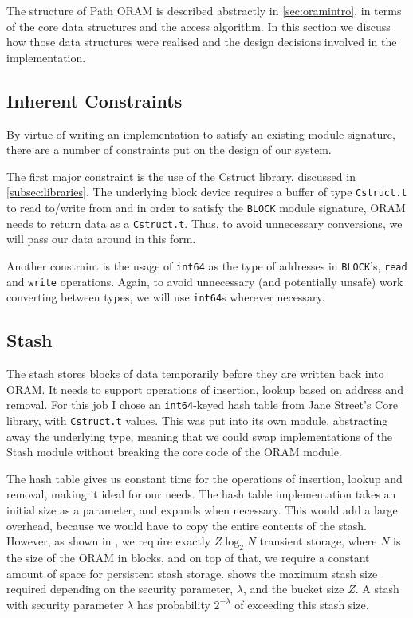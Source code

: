 \documentclass[12pt,a4paper,twoside,openright]{report}
\begin{document}
The structure of Path ORAM is described abstractly in \cref{sec:oramintro}, in terms of the core data structures and the access algorithm. In this section we discuss how those data structures were realised and the design decisions involved in the implementation.

\subsection{Inherent Constraints}
\label{subsec:constraints}

By virtue of writing an implementation to satisfy an existing module signature, there are a number of constraints put on the design of our system.

The first major constraint is the use of the Cstruct library, discussed in \cref{subsec:libraries}. The underlying block device requires a buffer of type \texttt{Cstruct.t} to read to/write from and in order to satisfy the \texttt{BLOCK} module signature, ORAM needs to return data as a \texttt{Cstruct.t}. Thus, to avoid unnecessary conversions, we will pass our data around in this form.

Another constraint is the usage of \texttt{int64} as the type of addresses in \texttt{BLOCK}'s, \texttt{read} and \texttt{write} operations. Again, to avoid unnecessary (and potentially unsafe) work converting between types, we will use \texttt{int64}s wherever necessary.

\subsection{Stash}

The stash stores blocks of data temporarily before they are written back into ORAM. It needs to support operations of insertion, lookup based on address and removal. For this job I chose an \texttt{int64}-keyed hash table from Jane Street's Core library, with \texttt{Cstruct.t} values. This was put into its own module, abstracting away the underlying type, meaning that we could swap implementations of the Stash module without breaking the core code of the ORAM module.

The hash table gives us constant time for the operations of insertion, lookup and removal, making it ideal for our needs. The hash table implementation takes an initial size as a parameter, and expands when necessary. This would add a large overhead, because we would have to copy the entire contents of the stash. However, as shown in \cite{stefanov2013path}, we require exactly $Z\log_2N$ transient storage, where $N$ is the size of the ORAM in blocks, and on top of that, we require a constant amount of space for persistent stash storage.  shows the maximum stash size required depending on the security parameter, $\lambda$, and the bucket size $Z$. A stash with security parameter $\lambda$ has probability $2^{-\lambda}$ of exceeding this stash size.
\end{document}
